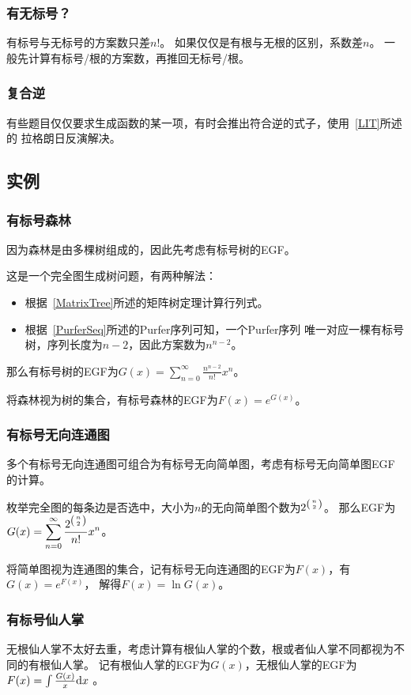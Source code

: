 \subsubsection{有无标号？}
有标号与无标号的方案数只差$n!$。
如果仅仅是有根与无根的区别，系数差$n$。
一般先计算有标号/根的方案数，再推回无标号/根。
\subsubsection{复合逆}
有些题目仅仅要求生成函数的某一项，有时会推出符合逆的式子，使用~\ref{LIT}所述的
拉格朗日反演解决。
\subsection{实例}
\subsubsection{有标号森林}
因为森林是由多棵树组成的，因此先考虑有标号树的EGF。

这是一个完全图生成树问题，有两种解法：
\begin{itemize}
    \item 根据~\ref{MatrixTree}所述的矩阵树定理计算行列式。
    \item 根据~\ref{PurferSeq}所述的Purfer序列可知，一个Purfer序列
    唯一对应一棵有标号树，序列长度为$n-2$，因此方案数为$n^{n-2}$。
\end{itemize}

那么有标号树的EGF为$G(x)=\displaystyle \sum_{n=0}^\infty{\frac{n^{n-2}}{n!}x^n}$。

将森林视为树的集合，有标号森林的EGF为$F(x)=e^{G(x)}$。
\subsubsection{有标号无向连通图}
多个有标号无向连通图可组合为有标号无向简单图，考虑有标号无向简单图EGF的计算。

枚举完全图的每条边是否选中，大小为$n$的无向简单图个数为$2^{\left(n \atop 2\right)}$。
那么EGF为$G(x)=\displaystyle \sum_{n=0}^\infty{\frac{2^{\left(n \atop 2\right)}}{n!}x^n}$。

将简单图视为连通图的集合，记有标号无向连通图的EGF为$F(x)$，有$G(x)=e^{F(x)}$，
解得$F(x)=\ln G(x)$。
\subsubsection{有标号仙人掌}
无根仙人掌不太好去重，考虑计算有根仙人掌的个数，根或者仙人掌不同都视为不同的有根仙人掌。
记有根仙人掌的EGF为$G(x)$，无根仙人掌的EGF为$F(x)=\int \frac{G(x)}{x} \textrm{d} x$
。

